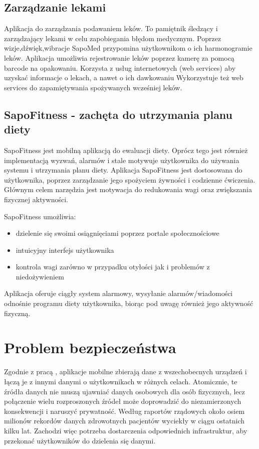 \subsection{Zarządzanie lekami \cite{6655256}}
 Aplikacja do zarządzania podawaniem leków. To pamiętnik śledzący i zarządzający lekami w celu zapobiegania błędom medycznym. 
 Poprzez wizje,dźwięk,wibracje  SapoMed przypomina użytkownikom o ich harmonogramie leków.
 Aplikacja umożliwia rejestrowanie leków poprzez kamerę za pomocą barcode na opakowaniu. 
 Korzysta z usług internetowych (web services) aby uzyskać informacje o lekach, a nawet o ich dawkowaniu
 Wykorzystuje też web services do zapamiętywania spożywanych wcześniej leków.

\subsection{SapoFitness - zachęta do utrzymania planu diety \cite{6026782}}
SapoFitness jest mobilną aplikacją do ewaluacji diety. Oprócz tego jest również implementacją wyzwań, alarmów i stale motywuje użytkownika do używania systemu i utrzymania planu diety. Aplikacja SapoFitness jest dostosowana do użytkownika, poprzez zarządzanie jego spożyciem żywności i codzienne ćwiczenia. Głównym celem narzędzia jest motywacja do redukowania wagi oraz zwiększania fizycznej aktywności. 

SapoFitness umożliwia:
\begin{itemize}
\item dzielenie się swoimi osiągnięciami poprzez portale społecznościowe
\item intuicyjny interfejs użytkownika
\item kontrola wagi zarówno w przypadku otyłości jak i problemów z niedożywieniem
\end{itemize}
Aplikacja oferuje ciągły system alarmowy, wysyłanie alarmów/wiadomości odnośnie programu diety użytkownika, biorąc pod uwagę również jego aktywność fizyczną.


\section{Problem bezpieczeństwa}
\label{sec:problem_bezp}
Zgodnie z pracą \cite{Ammar2014}, aplikacje mobilne zbierają dane z wszechobecnych urządzeń i łączą je z innymi danymi o użytkownikach w różnych celach. Atomicznie, te źródła danych nie muszą ujawniać danych osobowych dla osób fizycznych, lecz połączenie wielu rozproszonych źródeł może doprowadzić do niezamierzonych konsekwencji i naruszyć prywatność. Według raportów rządowych około osiem milionów rekordów danych zdrowotnych pacjentów wyciekły w ciągu ostatnich kilku lat. Zachodzi więc potrzeba dostarczenia odpowiednich infrastruktur, aby przekonać użytkowników do dzielenia się danymi. 

